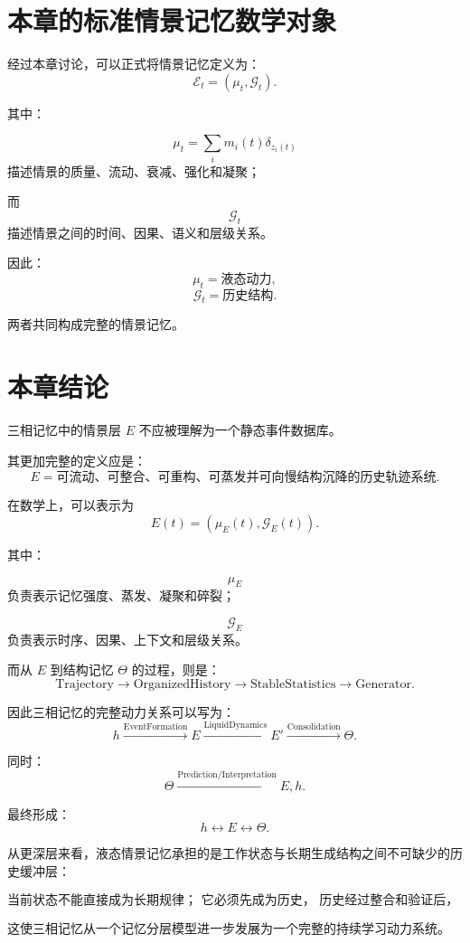 \section{本章的标准情景记忆数学对象}

经过本章讨论，可以正式将情景记忆定义为：
\[
\boxed{
\mathcal{E}_t
=
\left(
\mu_t,
\mathcal{G}_t
\right).
}
\]

其中：

\[
\mu_t
=
\sum_i
m_i(t)
\delta_{z_i(t)}
\]
描述情景的质量、流动、衰减、强化和凝聚；

而
\[
\mathcal{G}_t
\]
描述情景之间的时间、因果、语义和层级关系。

因此：
\[
\boxed{
\mu_t
=
\text{液态动力},
}
\]
\[
\boxed{
\mathcal{G}_t
=
\text{历史结构}.
}
\]

两者共同构成完整的情景记忆。

\section{本章结论}

三相记忆中的情景层 $E$ 不应被理解为一个静态事件数据库。

其更加完整的定义应是：
\[
\boxed{
E=
\text{可流动、可整合、可重构、可蒸发并可向慢结构沉降的历史轨迹系统}.
}
\]

在数学上，可以表示为
\[
\boxed{
E(t)
=
\left(
\mu_E(t),
\mathcal{G}_E(t)
\right).
}
\]

其中：

\[
\mu_E
\]
负责表示记忆强度、蒸发、凝聚和碎裂；

\[
\mathcal{G}_E
\]
负责表示时序、因果、上下文和层级关系。

而从 $E$ 到结构记忆 $\Theta$ 的过程，则是：
\[
\boxed{
\mathrm{Trajectory}
\rightarrow
\mathrm{OrganizedHistory}
\rightarrow
\mathrm{StableStatistics}
\rightarrow
\mathrm{Generator}.
}
\]

因此三相记忆的完整动力关系可以写为：
\[
\boxed{
h
\xrightarrow{
\mathrm{EventFormation}
}
E
\xrightarrow{
\mathrm{LiquidDynamics}
}
E'
\xrightarrow{
\mathrm{Consolidation}
}
\Theta.
}
\]

同时：
\[
\boxed{
\Theta
\xrightarrow{
\mathrm{Prediction/Interpretation}
}
E,h.
}
\]

最终形成：
\[
\boxed{
h
\leftrightarrow
E
\leftrightarrow
\Theta.
}
\]

从更深层来看，液态情景记忆承担的是工作状态与长期生成结构之间不可缺少的历史缓冲层：

\[
\boxed{
\text{当前状态不能直接成为长期规律；
它必须先成为历史，
历史经过整合和验证后，
其中稳定的部分才有资格成为结构。}
}
\]

这使三相记忆从一个记忆分层模型进一步发展为一个完整的持续学习动力系统。